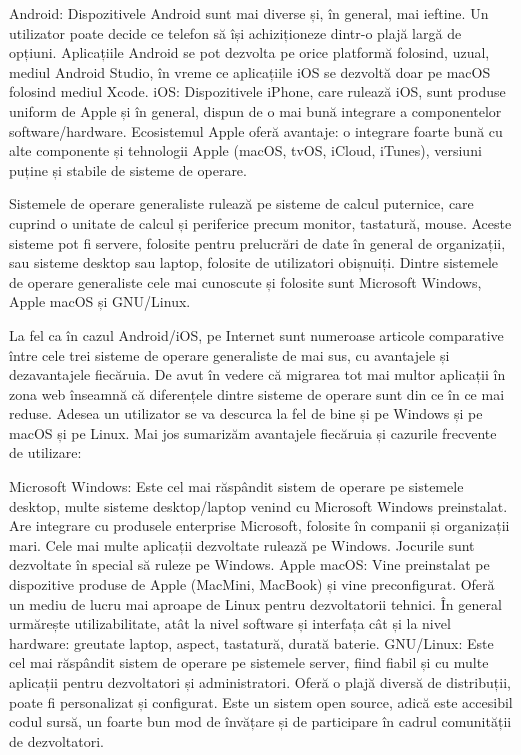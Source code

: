 Android: Dispozitivele Android sunt mai diverse și, în general, mai ieftine. Un utilizator poate decide ce telefon să își achiziționeze dintr-o plajă largă de opțiuni. Aplicațiile Android se pot dezvolta pe orice platformă folosind, uzual, mediul Android Studio, în vreme ce aplicațiile iOS se dezvoltă doar pe macOS folosind mediul Xcode.
iOS: Dispozitivele iPhone, care rulează iOS, sunt produse uniform de Apple și în general, dispun de o mai bună integrare a componentelor software/hardware. Ecosistemul Apple oferă avantaje: o integrare foarte bună cu alte componente și tehnologii Apple (macOS, tvOS, iCloud, iTunes), versiuni puține și stabile de sisteme de operare.

Sistemele de operare generaliste rulează pe sisteme de calcul puternice, care cuprind o unitate de calcul și periferice precum monitor, tastatură, mouse. Aceste sisteme pot fi servere, folosite pentru prelucrări de date în general de organizații, sau sisteme desktop sau laptop, folosite de utilizatori obișnuiți. Dintre sistemele de operare generaliste cele mai cunoscute și folosite sunt Microsoft Windows, Apple macOS și GNU/Linux.

La fel ca în cazul Android/iOS, pe Internet sunt numeroase articole comparative între cele trei sisteme de operare generaliste de mai sus, cu avantajele și dezavantajele fiecăruia. De avut în vedere că migrarea tot mai multor aplicații în zona web înseamnă că diferențele dintre sisteme de operare sunt din ce în ce mai reduse. Adesea un utilizator se va descurca la fel de bine și pe Windows și pe macOS și pe Linux. Mai jos sumarizăm avantajele fiecăruia și cazurile frecvente de utilizare:

Microsoft Windows: Este cel mai răspândit sistem de operare pe sistemele desktop, multe sisteme desktop/laptop venind cu Microsoft Windows preinstalat. Are integrare cu produsele enterprise Microsoft, folosite în companii și organizații mari. Cele mai multe aplicații dezvoltate rulează pe Windows. Jocurile sunt dezvoltate în special să ruleze pe Windows.
Apple macOS: Vine preinstalat pe dispozitive produse de Apple (MacMini, MacBook) și vine preconfigurat. Oferă un mediu de lucru mai aproape de Linux pentru dezvoltatorii tehnici. În general urmărește utilizabilitate, atât la nivel software și interfața cât și la nivel hardware: greutate laptop, aspect, tastatură, durată baterie.
GNU/Linux: Este cel mai răspândit sistem de operare pe sistemele server, fiind fiabil și cu multe aplicații pentru dezvoltatori și administratori. Oferă o plajă diversă de distribuții, poate fi personalizat și configurat. Este un sistem open source, adică este accesibil codul sursă, un foarte bun mod de învățare și de participare în cadrul comunității de dezvoltatori.

